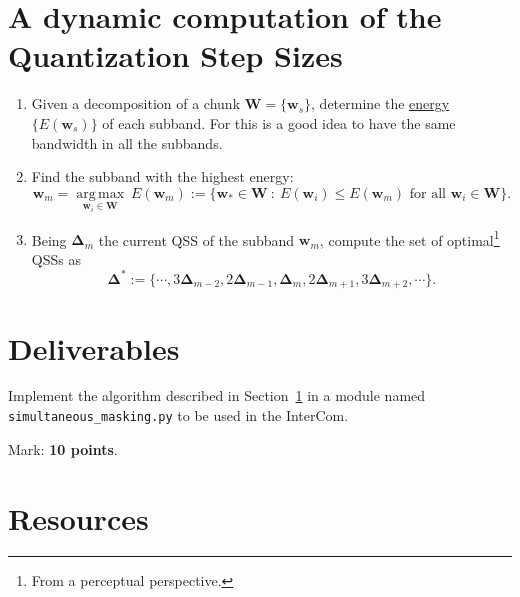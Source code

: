 \section{A dynamic computation of the Quantization Step Sizes}
\label{sec:algo}
\begin{enumerate}
\item Given a decomposition of a chunk
  ${\mathbf W}=\{{\mathbf w}_s\}$, determine the
  \href{https://en.wikipedia.org/wiki/Energy_(signal_processing)}{energy}
  $\{E({\mathbf w}_s)\}$ of each subband. For this is a good idea to
  have the same bandwidth in all the subbands.
\item Find the subband with the highest energy:
  \begin{equation}
    {\mathbf w}_m = \underset{{\mathbf w}_i \in {\mathbf W}}{\operatorname{arg\,max}}~E({\mathbf w}_m) := \{{\mathbf w}_* \in {\mathbf W} ~:~ E({\mathbf w}_i) \leq E({\mathbf w}_m) \text{ for all } {\mathbf w}_i \in {\mathbf W} \}.
  \end{equation}
\item Being ${\mathbf \Delta}_m$ the current QSS of the subband
  ${\mathbf w}_m$, compute the set of optimal\footnote{From a
    perceptual perspective.} QSSs as
  \begin{equation}
    {\mathbf \Delta}^* := \{\cdots,3{\mathbf \Delta}_{m-2},2{\mathbf \Delta}_{m-1},{\mathbf \Delta}_m,2{\mathbf \Delta}_{m+1},3{\mathbf \Delta}_{m+2}, \cdots\}.
  \end{equation}
\end{enumerate}

\section{Deliverables}

Implement the algorithm described in Section~\ref{sec:algo} in a
module named \verb|simultaneous_masking.py| to be used in the
InterCom.

Mark: \textbf{10 points}.

\section{Resources}



